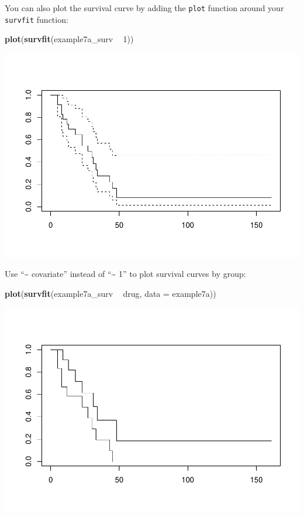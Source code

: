 \documentclass[]{book}
\newenvironment{Shaded}{\begin{snugshade}}{\end{snugshade}}
\newcommand{\DataTypeTok}[1]{\textcolor[rgb]{0.13,0.29,0.53}{#1}}
\newcommand{\DecValTok}[1]{\textcolor[rgb]{0.00,0.00,0.81}{#1}}
\newcommand{\KeywordTok}[1]{\textcolor[rgb]{0.13,0.29,0.53}{\textbf{#1}}}
\newcommand{\NormalTok}[1]{#1}
\newcommand{\OperatorTok}[1]{\textcolor[rgb]{0.81,0.36,0.00}{\textbf{#1}}}
\newcommand{\StringTok}[1]{\textcolor[rgb]{0.31,0.60,0.02}{#1}}
\begin{document}
You can also plot the survival curve by adding the \texttt{plot}
function around your \texttt{survfit} function:

\begin{Shaded}
\begin{Highlighting}[]
\KeywordTok{plot}\NormalTok{(}\KeywordTok{survfit}\NormalTok{(example7a_surv }\OperatorTok{~}\StringTok{ }\DecValTok{1}\NormalTok{))}
\end{Highlighting}
\end{Shaded}

\includegraphics{07-week7_files/figure-latex/week7d-1.pdf}

Use ``\textasciitilde{} covariate'' instead of ``\textasciitilde{} 1''
to plot survival curves by group:

\begin{Shaded}
\begin{Highlighting}[]
\KeywordTok{plot}\NormalTok{(}\KeywordTok{survfit}\NormalTok{(example7a_surv }\OperatorTok{~}\StringTok{ }\NormalTok{drug, }\DataTypeTok{data =}\NormalTok{ example7a))}
\end{Highlighting}
\end{Shaded}

\includegraphics{07-week7_files/figure-latex/week7e-1.pdf}
\end{document}
